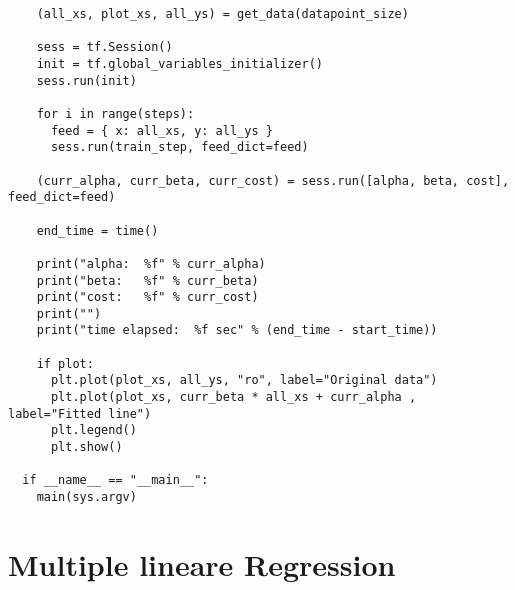 \begin{verbatim}
    (all_xs, plot_xs, all_ys) = get_data(datapoint_size)

    sess = tf.Session()
    init = tf.global_variables_initializer()
    sess.run(init)

    for i in range(steps):
      feed = { x: all_xs, y: all_ys }
      sess.run(train_step, feed_dict=feed)

    (curr_alpha, curr_beta, curr_cost) = sess.run([alpha, beta, cost], feed_dict=feed)

    end_time = time()

    print("alpha:  %f" % curr_alpha)
    print("beta:   %f" % curr_beta)
    print("cost:   %f" % curr_cost)
    print("")
    print("time elapsed:  %f sec" % (end_time - start_time))

    if plot:
      plt.plot(plot_xs, all_ys, "ro", label="Original data")
      plt.plot(plot_xs, curr_beta * all_xs + curr_alpha , label="Fitted line")
      plt.legend()
      plt.show()

  if __name__ == "__main__":
    main(sys.argv)
\end{verbatim}

\section{Multiple lineare Regression}

